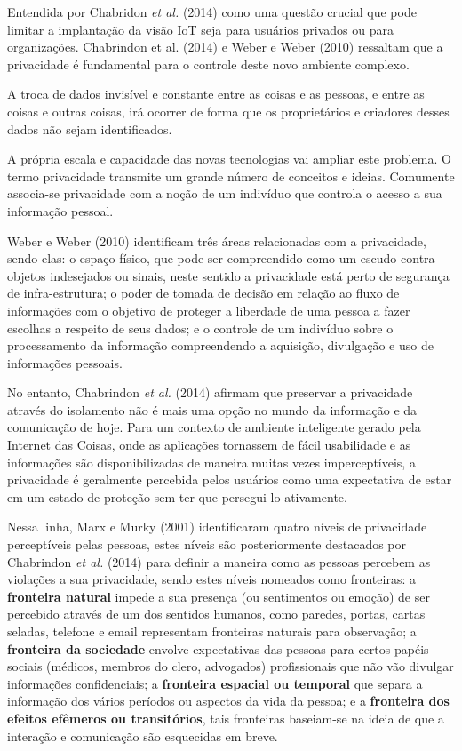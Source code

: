 Entendida por Chabridon \textit{et al.} (2014) como uma questão crucial que pode limitar a implantação da visão IoT seja para usuários privados ou para organizações. Chabrindon et al. (2014) e Weber e Weber (2010) ressaltam que a privacidade é fundamental para o controle deste novo ambiente complexo.

A troca de dados invisível e constante entre as coisas e as pessoas, e entre as coisas e outras coisas, irá ocorrer de forma que os proprietários e criadores desses dados não sejam identificados.

A própria escala e capacidade das novas tecnologias vai ampliar este problema. O termo privacidade transmite um grande número de conceitos e ideias. Comumente associa-se privacidade com a noção de um indivíduo que controla o acesso a sua informação pessoal.

Weber e Weber (2010) identificam três áreas relacionadas com a privacidade, sendo elas: o espaço físico, que pode ser compreendido como um escudo contra objetos indesejados ou sinais, neste sentido a privacidade está perto de segurança de infra-estrutura; o poder de tomada de decisão em relação ao fluxo de informações com o objetivo de proteger a liberdade de uma pessoa a fazer escolhas a respeito de seus dados; e o controle de um indivíduo sobre o processamento da informação compreendendo a aquisição, divulgação e uso de informações pessoais.

No entanto, Chabrindon \textit{et al.} (2014) afirmam que preservar a privacidade através do isolamento não é mais uma opção no mundo da informação e da comunicação de hoje. Para um contexto de ambiente inteligente gerado pela Internet das Coisas, onde as aplicações tornassem de fácil usabilidade e as informações são disponibilizadas de maneira muitas vezes imperceptíveis, a privacidade é geralmente percebida pelos usuários como uma expectativa de estar em um estado de proteção sem ter que persegui-lo ativamente.

Nessa linha, Marx e Murky (2001) identificaram quatro níveis de privacidade perceptíveis pelas pessoas, estes níveis são posteriormente destacados por Chabrindon \textit{et al.} (2014) para definir a maneira como as pessoas percebem as violações a sua privacidade, sendo estes níveis nomeados como fronteiras: a \textbf{fronteira natural} impede a sua presença (ou sentimentos ou emoção) de ser percebido através de um dos sentidos humanos, como paredes, portas, cartas seladas, telefone e email representam fronteiras naturais para observação; a \textbf{fronteira da sociedade} envolve expectativas das pessoas para certos papéis sociais (médicos, membros do clero, advogados) profissionais que não vão divulgar informações confidenciais; a \textbf{fronteira espacial ou temporal} que separa a informação dos vários períodos ou aspectos da vida da pessoa; e a \textbf{fronteira dos efeitos efêmeros ou transitórios}, tais fronteiras baseiam-se na ideia de que a interação e comunicação são esquecidas em breve.

